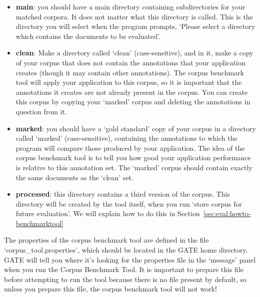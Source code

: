 \begin{itemize}
  
\item {\bf main}: you should have a main directory containing subdirectories for
  your matched corpora. It does not matter what this directory is called. This
  is the directory you will select when the program prompts, `Please select a
  directory which contains the documents to be evaluated'.

\item {\bf clean}: Make a directory called `clean' (case-sensitive), and in it,
make a copy of your corpus that does not contain the annotations that your
application creates (though it may contain other annotations). The corpus
benchmark tool will apply your application to this corpus, so it is important
that the annotations it creates are not already present in the corpus. You can
create this corpus by copying your `marked' corpus and deleting the annotations
in question from it.

\item {\bf marked}: you should have a `gold standard' copy of your corpus in a
directory called `marked' (case-sensitive), containing the annotations to which
the program will compare those produced by your application. The idea of the
corpus benchmark tool is to tell you how good your application performance is relative
to this annotation set. The `marked' corpus should contain exactly the same
documents as the `clean' set.

\item {\bf processed}: this directory contains a third version of the corpus.
This directory will be created by the tool itself, when you run `store corpus for
future evaluation'. We will explain how to do this in
Section~\ref{sec:eval:howto-benchmarktool}

\end{itemize}


The properties of the corpus benchmark tool are defined in the file
`corpus\_tool.properties', which should be located in the GATE home directory. GATE
will tell you where it's looking for the properties file in the `message' panel
when you run the Corpus Benchmark Tool. It is important to prepare this file
before attempting to run the tool because there is no file present by default, so
unless you prepare this file, the corpus benchmark tool will not work!

